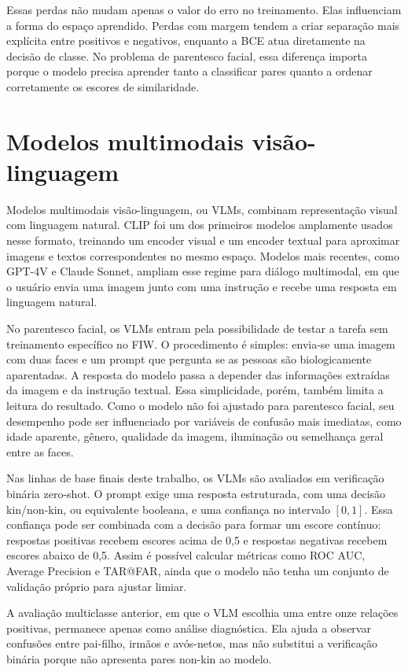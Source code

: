 Essas perdas não mudam apenas o valor do erro no treinamento. Elas influenciam a forma do espaço aprendido. Perdas com margem tendem a criar separação mais explícita entre positivos e negativos, enquanto a BCE atua diretamente na decisão de classe. No problema de parentesco facial, essa diferença importa porque o modelo precisa aprender tanto a classificar pares quanto a ordenar corretamente os escores de similaridade.

\section{Modelos multimodais visão-linguagem}

Modelos multimodais visão-linguagem, ou VLMs, combinam representação visual com linguagem natural. CLIP \cite{radford2021learning} foi um dos primeiros modelos amplamente usados nesse formato, treinando um encoder visual e um encoder textual para aproximar imagens e textos correspondentes no mesmo espaço. Modelos mais recentes, como GPT-4V e Claude Sonnet, ampliam esse regime para diálogo multimodal, em que o usuário envia uma imagem junto com uma instrução e recebe uma resposta em linguagem natural.

No parentesco facial, os VLMs entram pela possibilidade de testar a tarefa sem treinamento específico no FIW. O procedimento é simples: envia-se uma imagem com duas faces e um prompt que pergunta se as pessoas são biologicamente aparentadas. A resposta do modelo passa a depender das informações extraídas da imagem e da instrução textual. Essa simplicidade, porém, também limita a leitura do resultado. Como o modelo não foi ajustado para parentesco facial, seu desempenho pode ser influenciado por variáveis de confusão mais imediatas, como idade aparente, gênero, qualidade da imagem, iluminação ou semelhança geral entre as faces.

Nas linhas de base finais deste trabalho, os VLMs são avaliados em verificação binária zero-shot. O prompt exige uma resposta estruturada, com uma decisão kin/non-kin, ou equivalente booleana, e uma confiança no intervalo $[0,1]$. Essa confiança pode ser combinada com a decisão para formar um escore contínuo: respostas positivas recebem escores acima de 0,5 e respostas negativas recebem escores abaixo de 0,5. Assim é possível calcular métricas como ROC AUC, Average Precision e TAR@FAR, ainda que o modelo não tenha um conjunto de validação próprio para ajustar limiar.

A avaliação multiclasse anterior, em que o VLM escolhia uma entre onze relações positivas, permanece apenas como análise diagnóstica. Ela ajuda a observar confusões entre pai-filho, irmãos e avós-netos, mas não substitui a verificação binária porque não apresenta pares non-kin ao modelo.

